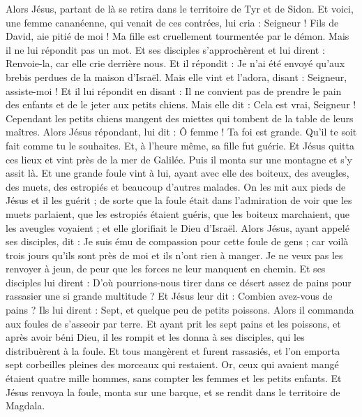 \begin{multicols}{2}
Alors Jésus, partant de là se retira dans le territoire de Tyr et de Sidon.
Et voici, une femme cananéenne, qui venait de ces contrées, lui cria : Seigneur ! Fils de David, aie pitié de moi ! Ma fille est cruellement tourmentée par le démon.
Mais il ne lui répondit pas un mot. Et ses disciples s'approchèrent et lui dirent : Renvoie-la, car elle crie derrière nous.
Et il répondit : Je n'ai été envoyé qu'aux brebis perdues de la maison d'Israël.
Mais elle vint et l'adora, disant : Seigneur, assiste-moi !
Et il lui répondit en disant : Il ne convient pas de prendre le pain des enfants et de le jeter aux petits chiens.
Mais elle dit : Cela est vrai, Seigneur ! Cependant les petits chiens mangent des miettes qui tombent de la table de leurs maîtres.
Alors Jésus répondant, lui dit : Ô femme ! Ta foi est grande. Qu'il te soit fait comme tu le souhaites. Et, à l'heure même, sa fille fut guérie.
Et Jésus quitta ces lieux et vint près de la mer de Galilée. Puis il monta sur une montagne et s'y assit là.
Et une grande foule vint à lui, ayant avec elle des boiteux, des aveugles, des muets, des estropiés et beaucoup d'autres malades. On les mit aux pieds de Jésus et il les guérit ;
de sorte que la foule était dans l'admiration de voir que les muets parlaient, que les estropiés étaient guéris, que les boiteux marchaient, que les aveugles voyaient ; et elle glorifiait le Dieu d'Israël.
Alors Jésus, ayant appelé ses disciples, dit : Je suis ému de compassion pour cette foule de gens ; car voilà trois jours qu'ils sont près de moi et ils n'ont rien à manger. Je ne veux pas les renvoyer à jeun, de peur que les forces ne leur manquent en chemin.
Et ses disciples lui dirent : D'où pourrions-nous tirer dans ce désert assez de pains pour rassasier une si grande multitude ?
Et Jésus leur dit : Combien avez-vous de pains ? Ils lui dirent : Sept, et quelque peu de petits poissons.
Alors il commanda aux foules de s'asseoir par terre.
Et ayant prit les sept pains et les poissons, et après avoir béni Dieu, il les rompit et les donna à ses disciples, qui les distribuèrent à la foule.
Et tous mangèrent et furent rassasiés, et l'on emporta sept corbeilles pleines des morceaux qui restaient.
Or, ceux qui avaient mangé étaient quatre mille hommes, sans compter les femmes et les petits enfants.
Et Jésus renvoya la foule, monta sur une barque, et se rendit dans le territoire de Magdala.

\end{multicols}
